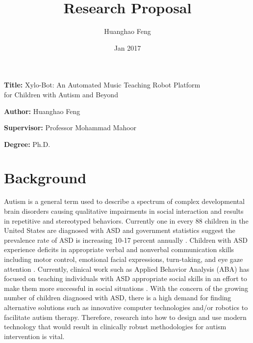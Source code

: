\documentclass[12pt]{report}
\title{Research Proposal}
\author{Huanghao Feng}
\date{Jan 2017}
\newcommand{\namelistlabel}[1]{\mbox{#1}\hfil}
\newenvironment{namelist}[1]{%
\begin{list}{}
    {
        \let\makelabel\namelistlabel
        \settowidth{\labelwidth}{#1}
        \setlength{\leftmargin}{1.1\labelwidth}
    }
  }{%
\end{list}}
\begin{document}
\maketitle

\begin{namelist}{xxxxxxxxxxxx}
\item[{\bf Title:}]
	Xylo-Bot: An Automated Music Teaching Robot Platform \\
	for Children with Autism and Beyond
\item[{\bf Author:}]
	Huanghao Feng
\item[{\bf Supervisor:}]
	Professor Mohammad Mahoor
\item[{\bf Degree:}]
	Ph.D.
\end{namelist}

\section*{Background} 
Autism is a general term used to describe a spectrum of complex developmental
brain disorders causing qualitative impairments in social interaction and results in
repetitive and stereotyped behaviors. Currently one in every 88 children in the United
States are diagnosed with ASD and government statistics suggest the prevalence rate of
ASD is increasing 10-17 percent annually \cite{Fetch2002}. Children with ASD experience deficits in
appropriate verbal and nonverbal communication skills including motor control, emotional
facial expressions, turn-taking, and eye gaze attention \cite{RobotPlaymate2002}. Currently, clinical work such as Applied
Behavior Analysis (ABA) \cite{RollingRobot2002, MobileRobotic2002} has focused on teaching individuals with ASD
appropriate social skills in an effort to make them more successful in social situations \cite{Behavioral1964}.
With the concern of the growing number of children diagnosed with ASD, there is a high
demand for finding alternative solutions such as innovative computer technologies and/or
robotics to facilitate autism therapy. Therefore, research into how to design and use modern
technology that would result in clinically robust methodologies for autism intervention is
vital.\\
\end{document}
